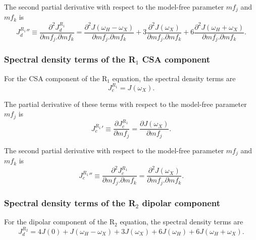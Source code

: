 \noindent The second partial derivative with respect to the model-free parameter $mf_j$ and $mf_k$ is
\begin{equation}
    {J_d^{R_1}}'' \equiv \frac{\partial^2 J_d^{R_1}}{\partial mf_j . \partial mf_k}
        = \frac{\partial^2 J(\omega_H - \omega_X)}{\partial mf_j . \partial mf_k}
        + 3 \frac{\partial^2 J(\omega_X)}{\partial mf_j . \partial mf_k}
        + 6 \frac{\partial^2 J(\omega_H + \omega_X)}{\partial mf_j . \partial mf_k}.  \label{eq: J terms: JR1d"}
\end{equation}


\subsubsection{Spectral density terms of the R$_1$ CSA component}

For the CSA component of the R$_1$ equation, the spectral density terms are
\begin{equation}
    J_c^{R_1} = J(\omega_X).  \label{eq: J terms: JR1c}
\end{equation}

\noindent The partial derivative of these terms with respect to the model-free parameter $mf_j$ is
\begin{equation}
    {J_c^{R_1}}' \equiv \frac{\partial J_c^{R_1}}{\partial mf_j}
        = \frac{\partial J(\omega_X)}{\partial mf_j}.  \label{eq: J terms: JR1c'}
\end{equation}

\noindent The second partial derivative with respect to the model-free parameter $mf_j$ and $mf_k$ is
\begin{equation}
    {J_c^{R_1}}'' \equiv \frac{\partial^2 J_c^{R_1}}{\partial mf_j . \partial mf_k}
        = \frac{\partial^2 J(\omega_X)}{\partial mf_j . \partial mf_k}.  \label{eq: J terms: JR1c"}
\end{equation}


\subsubsection{Spectral density terms of the R$_2$ dipolar component}

For the dipolar component of the R$_2$ equation, the spectral density terms are
\begin{equation}
    J_d^{R_2} = 4J(0) + J(\omega_H - \omega_X) + 3J(\omega_X) + 6J(\omega_H) + 6J(\omega_H + \omega_X).  \label{eq: J terms: JR2d}
\end{equation}

